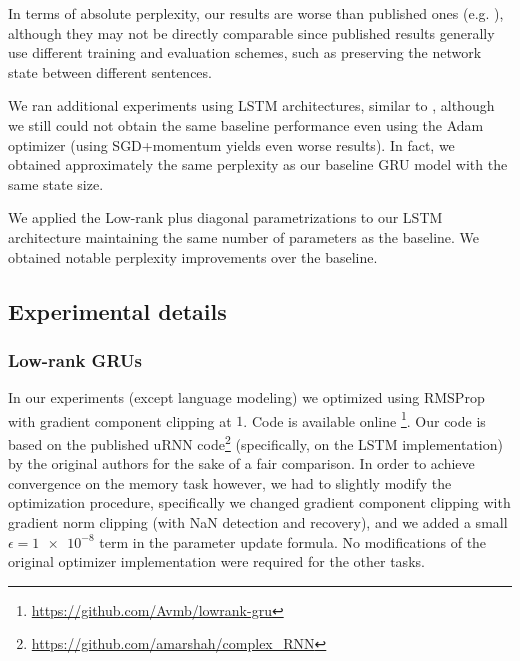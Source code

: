 \documentclass[11pt,a4paper]{article}
\begin{document}
In terms of absolute perplexity, our results are worse than published ones (e.g. ), although they may not be directly comparable since published results generally use different training and evaluation schemes, such as preserving the network state between different sentences.

We ran additional experiments using LSTM architectures, similar to , although we still could not obtain the same baseline performance even using the Adam optimizer (using SGD+momentum yields even worse results). In fact, we obtained approximately the same perplexity as our baseline GRU model with the same state size.

We applied the Low-rank plus diagonal parametrizations to our LSTM architecture maintaining the same number of parameters as the baseline. We obtained notable perplexity improvements over the baseline.

\subsection{Experimental details}

\subsubsection{Low-rank GRUs}
\label{SEC:GRUDETAIL}

In our experiments (except language modeling) we optimized using RMSProp \cite{Tieleman2012} with gradient component clipping at $1$. Code is available online
\footnote{
\url{https://github.com/Avmb/lowrank-gru}
}. Our code is based on the published uRNN code\footnote{\url{https://github.com/amarshah/complex_RNN}} (specifically, on the LSTM implementation) by the original authors for the sake of a fair comparison. In order to achieve convergence on the memory task however, we had to slightly modify the optimization procedure, specifically we changed gradient component clipping with gradient norm clipping (with NaN detection and recovery), and we added a small $\epsilon=\num{1e-8}$ term in the parameter update formula. No modifications of the original optimizer implementation were required for the other tasks.
\end{document}
